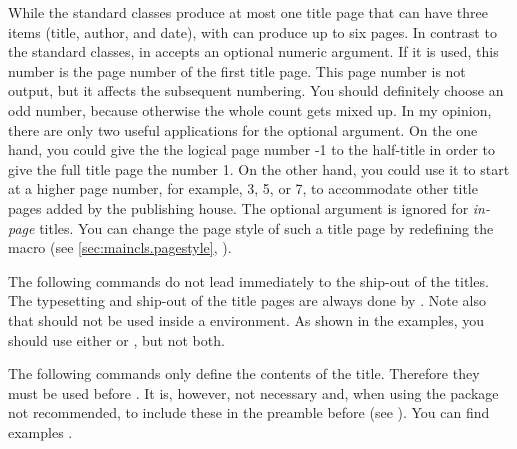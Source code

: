 \begin{Declaration}
\end{Declaration}%
While the standard classes
produce at most one title page that can have three items (title, author, and
date), with \KOMAScript{}  can produce up to six pages. In
contrast to the standard classes,  in {\KOMAScript} accepts
an optional numeric argument. If it is used, this number is the page number of
the first title page. This page number is not output, but it affects the
subsequent numbering. You should definitely choose an odd number, because
otherwise the whole count gets mixed up. In my opinion, there are only two
useful applications for the optional argument. On the one hand, you could give
the the logical page number -1 to the half-title
in order to give the full title page the number 1. On the other hand, you
could use it to start at a higher page number, for example, 3, 5, or 7, to
accommodate other title pages added by the publishing house.  The optional
argument is ignored for \emph{in-page} titles. You can change the page style
of such a title page by redefining the
 macro (see
\autoref{sec:maincls.pagestyle}, ).

The following commands do not lead immediately to the ship-out of the titles.
The typesetting and ship-out of the title pages are always done by
. Note also that  should not be used inside
a  environment.
As shown in the examples, you should use either
 or , but not
both.

The following commands only define the contents of the title. Therefore they
must be used before . It is, however, not necessary and, when
using the  package not recommended, to
include these in the preamble before  (see
\cite{package:babel}). You can find examples
.


